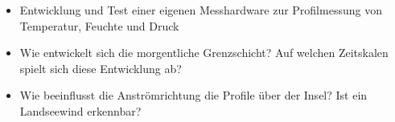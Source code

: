 \documentclass[a4paper,11pt,DIV=calc,tablecaptionabove,headinclude,twoside]{article}
\begin{document}
\begin{itemize}
\item Entwicklung und Test einer eigenen Messhardware zur Profilmessung von
    Temperatur, Feuchte und Druck
\item Wie entwickelt sich die morgentliche Grenzschicht? Auf welchen Zeitskalen spielt sich diese Entwicklung ab?
\item Wie beeinflusst die Anströmrichtung die Profile über der Insel? Ist ein
    Landseewind erkennbar?
\end{itemize}
\end{document}
